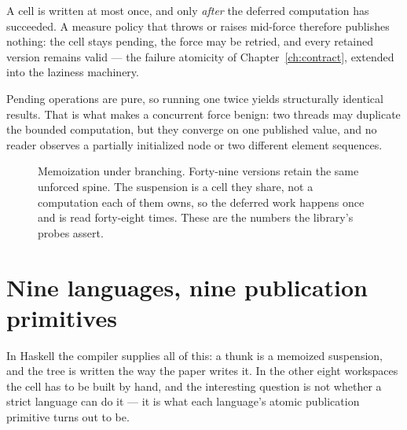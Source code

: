 \documentclass[11pt,twoside,openright]{book}
\begin{document}
\begin{contractbox}
A cell is written at most once, and only \emph{after} the deferred computation
has succeeded. A measure policy that throws or raises mid-force therefore
publishes nothing: the cell stays pending, the force may be retried, and every
retained version remains valid --- the failure atomicity of
Chapter~\ref{ch:contract}, extended into the laziness machinery.

Pending operations are pure, so running one twice yields structurally identical
results. That is what makes a concurrent force benign: two threads may duplicate
the bounded computation, but they converge on one published value, and no reader
observes a partially initialized node or two different element sequences.
\end{contractbox}

\begin{figure}[htbp]
\centering
{}
\caption{Memoization under branching. Forty-nine versions retain the same
unforced spine. The suspension is a cell they share, not a computation each of
them owns, so the deferred work happens once and is read forty-eight times.
These are the numbers the library's probes assert.}
\label{fig:suspension}
\end{figure}

\section{Nine languages, nine publication primitives}
\label{sec:nine-cells}

In Haskell the compiler supplies all of this: a thunk is a memoized suspension,
and the tree is written the way the paper writes it. In the other eight
workspaces the cell has to be built by hand, and the interesting question is not
whether a strict language can do it --- it is what each language's atomic
publication primitive turns out to be.
\end{document}
